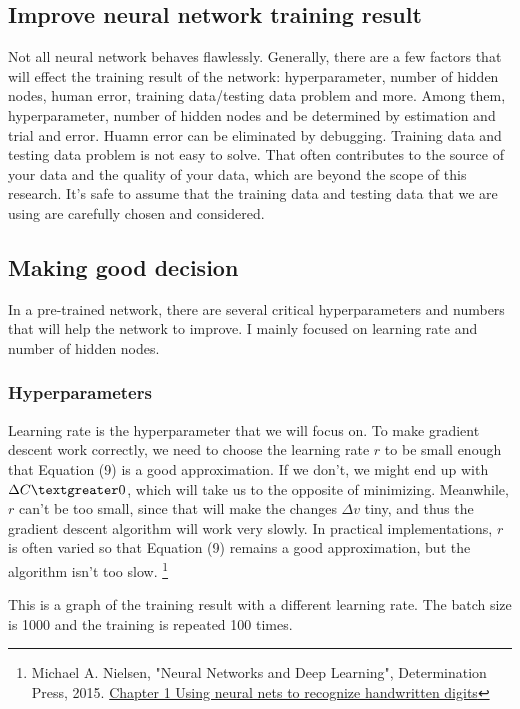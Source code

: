\documentclass[]{article}
\begin{document}
\begin{multicols}{2}
\section{Improve neural network training result}
Not all neural network behaves flawlessly. Generally, there are a few factors that will effect the training result of the network: hyperparameter, number of hidden nodes, human error, training data/testing data problem and more. Among them, hyperparameter, number of hidden nodes and be determined by estimation and trial and error. Huamn error can be eliminated by debugging. Training data and testing data problem is not easy to solve. That often contributes to the source of your data and the quality of your data, which are beyond the scope of this research. It's safe to assume that the training data and testing data that we are using are carefully chosen and considered.  

\subsection{Making good decision}

In a pre-trained network, there are several critical hyperparameters and numbers that will help the network to improve. I mainly focused on learning rate and number of hidden nodes. 
\subsubsection{Hyperparameters}

Learning rate is the hyperparameter that we will focus on. To make gradient descent work correctly, we need to choose the learning rate \(r\) to be small enough that Equation (9) is a good approximation. If we don't, we might end up with \(\Delta C \textgreater 0\), which will take us to the opposite of minimizing. Meanwhile,  \(r\) can't be too small, since that will make the changes \(\Delta v\) tiny, and thus the gradient descent algorithm will work very slowly. In practical implementations, \(r\) is often varied so that Equation (9) remains a good approximation, but the algorithm isn't too slow. \footnote{Michael A. Nielsen, "Neural Networks and Deep Learning", Determination Press, 2015. \href{http://neuralnetworksanddeeplearning.com/chap1.html}{Chapter 1 Using neural nets to recognize handwritten digits}}

This is a graph of the training result with a different learning rate. The batch size is 1000 and the training is repeated 100 times. 


\end{multicols}
\end{document}
